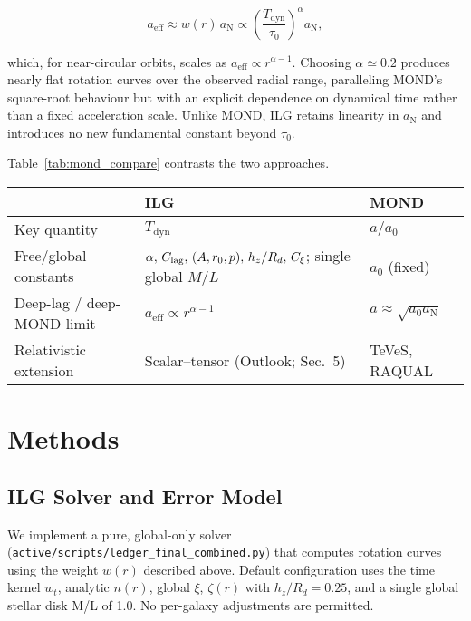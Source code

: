 \documentclass[usenatbib]{mnras}
\begin{document}
\begin{equation}
a_\mathrm{eff} \approx w(r) \, a_\mathrm{N} \propto \left(\frac{T_\mathrm{dyn}}{\tau_0}\right)^\alpha a_\mathrm{N},
\end{equation}

which, for near-circular orbits, scales as $a_\mathrm{eff} \propto r^{\alpha-1}$.  Choosing $\alpha \simeq 0.2$ produces nearly flat rotation curves over the observed radial range, paralleling MOND's square-root behaviour but with an explicit dependence on dynamical time rather than a fixed acceleration scale.  Unlike MOND, ILG retains linearity in $a_\mathrm{N}$ and introduces no new fundamental constant beyond $\tau_0$.

Table~\ref{tab:mond_compare} contrasts the two approaches.

\begin{table*}
\centering
\small
\setlength{\tabcolsep}{8pt}
\caption{Comparison of ILG and MOND Scaling Relations}
\label{tab:mond_compare}
\begin{tabularx}{0.97\textwidth}{l >{\raggedright\arraybackslash}X >{\raggedright\arraybackslash}X}
\toprule
 & ILG & MOND \\
\midrule
Key quantity & $T_\mathrm{dyn}$ & $a/a_0$ \\
Free/global constants & $\alpha,\,C_{\rm lag},\,(A,r_0,p),\,h_z/R_d,\,C_\xi$; single global $M/L$ & $a_0$ (fixed) \\
Deep-lag / deep-MOND limit & $a_\mathrm{eff} \propto r^{\alpha-1}$ & $a \approx \sqrt{a_0 a_\mathrm{N}}$ \\
Relativistic extension & Scalar–tensor (Outlook; Sec.~5) & TeVeS, RAQUAL \\
\bottomrule
\end{tabularx}
\end{table*}

\section{Methods}

\subsection{ILG Solver and Error Model}

We implement a pure, global-only solver (\texttt{active/scripts/ledger\_final\_combined.py}) that computes rotation curves using the weight $w(r)$ described above. Default configuration uses the time kernel $w_t$, analytic $n(r)$, global $\xi$, $\zeta(r)$ with $h_z/R_d=0.25$, and a single global stellar disk M/L of 1.0. No per-galaxy adjustments are permitted.
\end{document}
